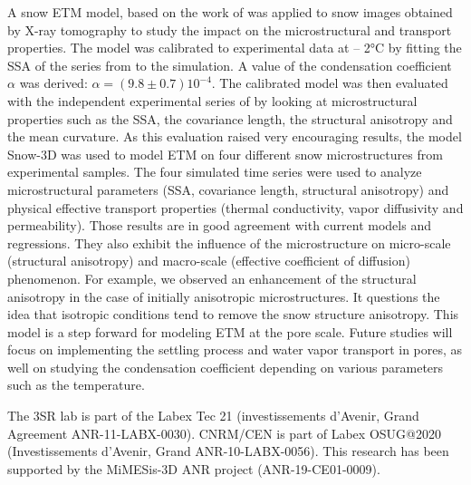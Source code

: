 \documentclass[draft,ms]{agujournal2019}
\begin{document}
A snow ETM model, based on the work of  was applied to snow images obtained by X-ray tomography to study the impact on the microstructural and transport properties. The model was calibrated to experimental data at – 2°C by fitting the SSA of the series from  to the simulation. A value of the condensation coefficient $\alpha$ was derived: $\alpha = ( 9.8 \pm 0.7) 10^{-4}$. The calibrated model was then evaluated with the independent experimental series of  by looking at microstructural properties such as the SSA, the covariance length, the structural anisotropy and the mean curvature. As this evaluation raised very encouraging results, the model Snow-3D was used to model ETM on four different snow microstructures from experimental samples. The four simulated time series were used to analyze microstructural parameters (SSA, covariance length, structural anisotropy) and physical effective transport properties (thermal conductivity, vapor diffusivity and permeability). Those results are in good agreement with current models and regressions. They also exhibit the influence of the microstructure on micro-scale (structural anisotropy) and macro-scale (effective coefficient of diffusion) phenomenon. For example, we observed an enhancement of the structural anisotropy in the case of initially anisotropic microstructures. It questions the idea that isotropic conditions tend to remove the snow structure anisotropy. This model is a step forward for modeling ETM at the pore scale. Future studies will focus on implementing the settling process and water vapor transport in pores, as well on studying the condensation coefficient depending on various parameters such as the temperature.  

\acknowledgments
The 3SR lab is part of the Labex Tec 21 (investissements d'Avenir, Grand Agreement ANR-11-LABX-0030). CNRM/CEN is part of Labex OSUG@2020 (Investissements d'Avenir, Grand ANR-10-LABX-0056). This research has been supported by the MiMESis-3D ANR project (ANR-19-CE01-0009).


\end{document}
